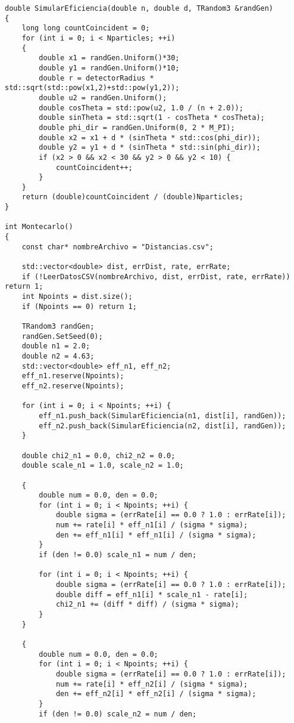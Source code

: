 \begin{lstlisting}
double SimularEficiencia(double n, double d, TRandom3 &randGen)
{
    long long countCoincident = 0;
    for (int i = 0; i < Nparticles; ++i)
    {
        double x1 = randGen.Uniform()*30;
        double y1 = randGen.Uniform()*10;
        double r = detectorRadius * std::sqrt(std::pow(x1,2)+std::pow(y1,2));
        double u2 = randGen.Uniform();
        double cosTheta = std::pow(u2, 1.0 / (n + 2.0));
        double sinTheta = std::sqrt(1 - cosTheta * cosTheta);
        double phi_dir = randGen.Uniform(0, 2 * M_PI);
        double x2 = x1 + d * (sinTheta * std::cos(phi_dir));
        double y2 = y1 + d * (sinTheta * std::sin(phi_dir));
        if (x2 > 0 && x2 < 30 && y2 > 0 && y2 < 10) {
            countCoincident++;
        }
    }
    return (double)countCoincident / (double)Nparticles;
}

int Montecarlo()
{
    const char* nombreArchivo = "Distancias.csv";

    std::vector<double> dist, errDist, rate, errRate;
    if (!LeerDatosCSV(nombreArchivo, dist, errDist, rate, errRate)) return 1;
    int Npoints = dist.size();
    if (Npoints == 0) return 1;

    TRandom3 randGen;
    randGen.SetSeed(0);
    double n1 = 2.0;
    double n2 = 4.63;
    std::vector<double> eff_n1, eff_n2;
    eff_n1.reserve(Npoints);
    eff_n2.reserve(Npoints);

    for (int i = 0; i < Npoints; ++i) {
        eff_n1.push_back(SimularEficiencia(n1, dist[i], randGen));
        eff_n2.push_back(SimularEficiencia(n2, dist[i], randGen));
    }

    double chi2_n1 = 0.0, chi2_n2 = 0.0;
    double scale_n1 = 1.0, scale_n2 = 1.0;

    {
        double num = 0.0, den = 0.0;
        for (int i = 0; i < Npoints; ++i) {
            double sigma = (errRate[i] == 0.0 ? 1.0 : errRate[i]);
            num += rate[i] * eff_n1[i] / (sigma * sigma);
            den += eff_n1[i] * eff_n1[i] / (sigma * sigma);
        }
        if (den != 0.0) scale_n1 = num / den;

        for (int i = 0; i < Npoints; ++i) {
            double sigma = (errRate[i] == 0.0 ? 1.0 : errRate[i]);
            double diff = eff_n1[i] * scale_n1 - rate[i];
            chi2_n1 += (diff * diff) / (sigma * sigma);
        }
    }

    {
        double num = 0.0, den = 0.0;
        for (int i = 0; i < Npoints; ++i) {
            double sigma = (errRate[i] == 0.0 ? 1.0 : errRate[i]);
            num += rate[i] * eff_n2[i] / (sigma * sigma);
            den += eff_n2[i] * eff_n2[i] / (sigma * sigma);
        }
        if (den != 0.0) scale_n2 = num / den;


\end{lstlisting}
